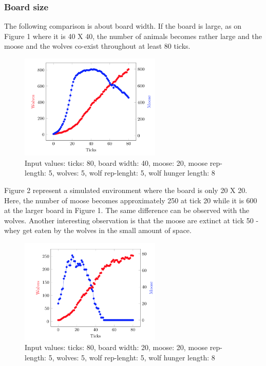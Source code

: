 \documentclass[a4paper]{report}
\begin{document}
\subsubsection*{Board size}
The following comparison is about board width. If the board is large, as on Figure 1 where it is 40 X 40, the number of animals becomes rather large and the moose and the wolves co-exist throughout at least 80 ticks. 

\begin{figure}[H]
\centering
\includegraphics[width=0.60\textwidth]{Experiments/sim_board_b1}
\caption{Input values: ticks: 80, board width: 40, moose: 20, moose rep-length: 5, wolves: 5, wolf rep-lenght: 5, wolf hunger length: 8}
\end{figure}

Figure 2 represent a simulated environment where the board is only 20 X 20. Here, the number of moose becomes approximately 250 at tick 20 while it is 600 at the larger board in Figure 1. The same difference can be observed with the wolves. Another interesting observation is that the moose are extinct at tick 50 - whey get eaten by the wolves in the small amount of space. 

\begin{figure}[H]
\centering
\includegraphics[width=0.60\textwidth]{Experiments/sim_board_b2} 
\caption{Input values: ticks: 80, board width: 20, moose: 20, moose rep-length: 5, wolves: 5, wolf rep-lenght: 5, wolf hunger length: 8}
\end{figure}
\end{document}
